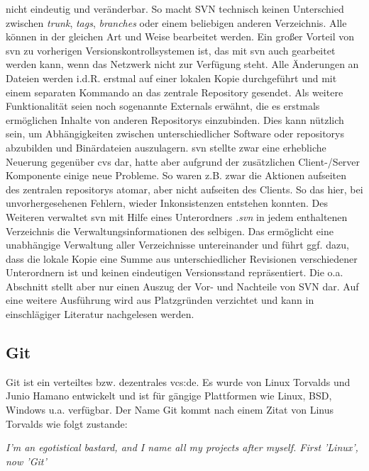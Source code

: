 nicht eindeutig und veränderbar.  So macht SVN technisch keinen Unterschied
zwischen \textit{trunk}, \textit{tags}, \textit{branches} oder einem beliebigen
anderen Verzeichnis. Alle können in der gleichen Art und Weise bearbeitet
werden. Ein großer Vorteil von \acrshort{svn} zu vorherigen
Versionskontrollsystemen ist, das mit \acrshort{svn} auch gearbeitet werden
kann, wenn das Netzwerk nicht zur Verfügung steht. Alle Änderungen an Dateien
werden i.d.R. erstmal auf einer lokalen Kopie durchgeführt und mit einem
separaten Kommando an das zentrale Repository gesendet. Als weitere
Funktionalität seien noch sogenannte Externals erwähnt, die es erstmals
ermöglichen Inhalte von anderen Repositorys einzubinden. Dies kann nützlich
sein, um Abhängigkeiten zwischen unterschiedlicher Software oder
\glspl{repository} abzubilden und Binärdateien auszulagern. \acrshort{svn}
stellte zwar eine erhebliche Neuerung gegenüber \acrshort{cvs} dar, hatte aber
aufgrund der zusätzlichen Client-/Server Komponente einige neue Probleme. So
waren z.B. zwar die Aktionen aufseiten des zentralen \glspl{repository} atomar,
aber nicht aufseiten des Clients. So das hier, bei unvorhergesehenen Fehlern,
wieder Inkonsistenzen entstehen konnten. Des Weiteren verwaltet \acrshort{svn}
mit Hilfe eines Unterordners \textit{.svn} in jedem enthaltenen Verzeichnis die
Verwaltungsinformationen des selbigen. Das ermöglicht eine unabhängige
Verwaltung aller Verzeichnisse untereinander und führt ggf. dazu, dass die
lokale Kopie eine Summe aus unterschiedlicher Revisionen verschiedener
Unterordnern ist und keinen eindeutigen Versionsstand repräsentiert.  Die o.a.
Abschnitt stellt aber nur einen Auszug der Vor- und Nachteile von SVN dar. Auf
eine weitere Ausführung wird aus Platzgründen verzichtet und kann in
einschlägiger Literatur nachgelesen werden.\cite[S.~383-385]{cd}

\subsection{Git}\label{git}
Git ist ein verteiltes bzw. dezentrales \acrlong{vcs:de}. Es wurde von Linux
Torvalds und Junio Hamano entwickelt und ist für gängige Plattformen wie
Linux, BSD, Windows u.a. verfügbar. Der Name Git kommt nach einem Zitat von
Linus Torvalds wie folgt zustande\cite{link:gitfaq}:

\begin{center}
\textit{\glqq{}I'm an egotistical bastard, and I name all my projects after
myself. First 'Linux', now 'Git'\grqq{}}\\
\end{center}

